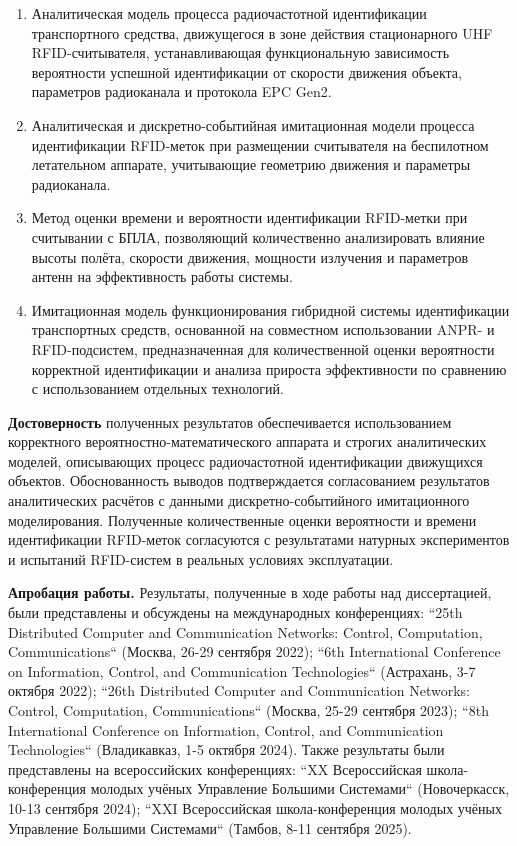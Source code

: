 \documentclass[12pt]{article}
\theoremstyle{definition}
\begin{document}
\begin{enumerate}
    \item Аналитическая модель процесса радиочастотной идентификации транспортного средства, движущегося в зоне действия стационарного UHF RFID-считывателя, устанавливающая функциональную зависимость вероятности успешной идентификации от скорости движения объекта, параметров радиоканала и протокола EPC Gen2.
    \item Аналитическая и дискретно-событийная имитационная модели процесса идентификации RFID-меток при размещении считывателя на беспилотном летательном аппарате, учитывающие геометрию движения и параметры радиоканала.
    \item Метод оценки времени и вероятности идентификации RFID-метки при считывании с БПЛА, позволяющий количественно анализировать влияние высоты полёта, скорости движения, мощности излучения и параметров антенн на эффективность работы системы.
    \item Имитационная модель функционирования гибридной системы идентификации транспортных средств, основанной на совместном использовании ANPR- и RFID-подсистем, предназначенная для количественной оценки вероятности корректной идентификации и анализа прироста эффективности по сравнению с использованием отдельных технологий.
\end{enumerate}

\textbf{Достоверность} полученных результатов обеспечивается использованием корректного вероятностно-математического аппарата и строгих аналитических моделей, описывающих процесс радиочастотной идентификации движущихся объектов. Обоснованность выводов подтверждается согласованием результатов аналитических расчётов с данными дискретно-событийного имитационного моделирования. Полученные количественные оценки вероятности и времени идентификации RFID-меток согласуются с результатами натурных экспериментов и испытаний RFID-систем в реальных условиях эксплуатации.

\textbf{Апробация работы.} Результаты, полученные в ходе работы над диссертацией, были представлены и обсуждены на международных конференциях: ``25th Distributed Computer and Communication Networks: Control, Computation, Communications`` (Москва, 26-29 сентября 2022); ``6th International Conference on Information, Control, and Communication Technologies`` (Астрахань, 3-7 октября 2022); ``26th Distributed Computer and Communication Networks: Control, Computation, Communications`` (Москва, 25-29 сентября 2023); ``8th International Conference on Information, Control, and Communication Technologies`` (Владикавказ, 1-5 октября 2024). Также результаты были представлены на всероссийских конференциях: ``XX Всероссийская школа-конференция молодых учёных Управление Большими Системами`` (Новочеркасск, 10-13 сентября 2024); ``XXI Всероссийская школа-конференция молодых учёных Управление Большими Системами`` (Тамбов, 8-11 сентября 2025).
\end{document}

